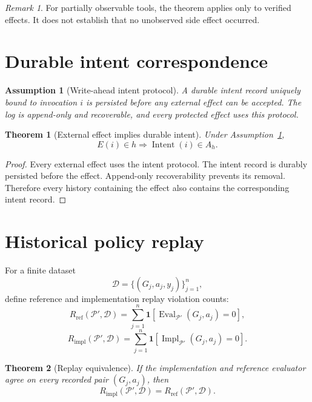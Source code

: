 \documentclass[11pt,a4paper]{article}
\newtheorem{assumption}{Assumption}[section]
\newtheorem{theorem}{Theorem}[section]
\theoremstyle{remark}
\newtheorem{remark}{Remark}[section]
\begin{document}
\begin{remark}
For partially observable tools, the theorem applies only to verified effects. It does not establish that no unobserved side effect occurred.
\end{remark}

\section{Durable intent correspondence}

\begin{assumption}[Write-ahead intent protocol]\label{a:intent}
A durable intent record uniquely bound to invocation $i$ is persisted before any external effect can be accepted. The log is append-only and recoverable, and every protected effect uses this protocol.
\end{assumption}

\begin{theorem}[External effect implies durable intent]\label{thm:intent}
Under Assumption~\ref{a:intent},
\[
E(i)\in h\Rightarrow \operatorname{Intent}(i)\in A_h.
\]
\end{theorem}

\begin{proof}
Every external effect uses the intent protocol. The intent record is durably persisted before the effect. Append-only recoverability prevents its removal. Therefore every history containing the effect also contains the corresponding intent record.
\end{proof}

\section{Historical policy replay}

For a finite dataset
\[
\mathcal D=\{(G_j,a_j,y_j)\}_{j=1}^n,
\]
define reference and implementation replay violation counts:
\[
R_{\mathrm{ref}}(\mathcal P',\mathcal D)
=\sum_{j=1}^n\mathbf 1[
\operatorname{Eval}_{\mathcal P'}(G_j,a_j)=0],
\]
\[
R_{\mathrm{impl}}(\mathcal P',\mathcal D)
=\sum_{j=1}^n\mathbf 1[
\operatorname{Impl}_{\mathcal P'}(G_j,a_j)=0].
\]

\begin{theorem}[Replay equivalence]\label{thm:replay}
If the implementation and reference evaluator agree on every recorded pair $(G_j,a_j)$, then
\[
R_{\mathrm{impl}}(\mathcal P',\mathcal D)
=R_{\mathrm{ref}}(\mathcal P',\mathcal D).
\]
\end{theorem}
\end{document}
